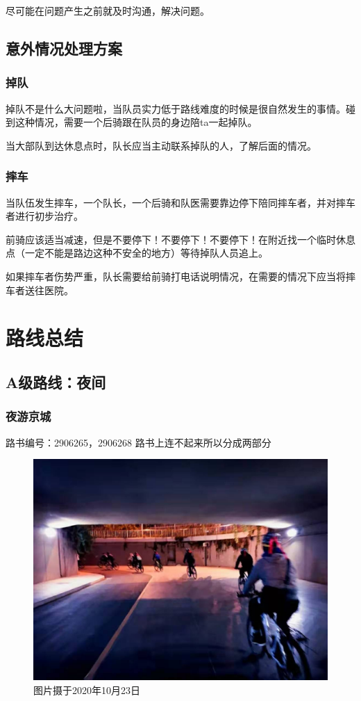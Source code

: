 \documentclass{ctexbook}
\begin{document}
尽可能在问题产生之前就及时沟通，解决问题。
\section{意外情况处理方案}
\subsection{掉队}
掉队不是什么大问题啦，当队员实力低于路线难度的时候是很自然发生的事情。碰到这种情况，需要一个后骑跟在队员的身边陪ta一起掉队。

当大部队到达休息点时，队长应当主动联系掉队的人，了解后面的情况。
\subsection{摔车}
当队伍发生摔车，一个队长，一个后骑和队医需要靠边停下陪同摔车者，并对摔车者进行初步治疗。

前骑应该适当减速，但是不要停下！不要停下！不要停下！在附近找一个临时休息点（一定不能是路边这种不安全的地方）等待掉队人员追上。

如果摔车者伤势严重，队长需要给前骑打电话说明情况，在需要的情况下应当将摔车者送往医院。


\chapter{路线总结}
\section{A级路线：夜间}
\subsection{夜游京城}
路书编号：2906265，2906268 路书上连不起来所以分成两部分

\begin{figure}[htp]
    \centering
    \includegraphics[width=0.7\linewidth]{fig/夜游京城1.jpg}
    \caption{图片摄于2020年10月23日}
\end{figure}
\end{document}
